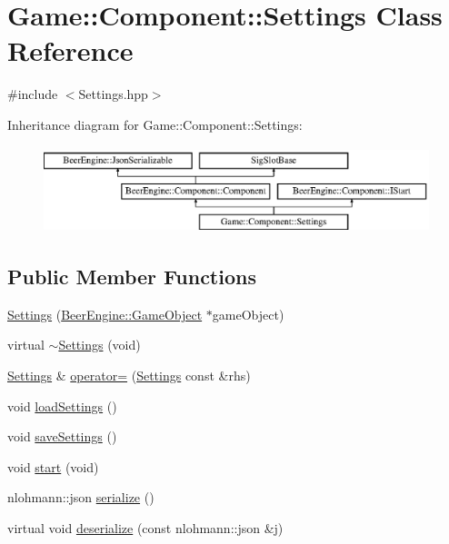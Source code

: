 \hypertarget{class_game_1_1_component_1_1_settings}{}\section{Game\+:\+:Component\+:\+:Settings Class Reference}
\label{class_game_1_1_component_1_1_settings}


{\ttfamily \#include $<$Settings.\+hpp$>$}

Inheritance diagram for Game\+:\+:Component\+:\+:Settings\+:\begin{figure}[H]
\begin{center}
\leavevmode
\includegraphics[height=2.500000cm]{class_game_1_1_component_1_1_settings}
\end{center}
\end{figure}
\subsection*{Public Member Functions}
\begin{DoxyCompactItemize}
\item 
\mbox{\hyperlink{class_game_1_1_component_1_1_settings_a2a0d16fdd698140da965cd3367601a49}{Settings}} (\mbox{\hyperlink{class_beer_engine_1_1_game_object}{Beer\+Engine\+::\+Game\+Object}} $\ast$game\+Object)
\item 
virtual \mbox{\hyperlink{class_game_1_1_component_1_1_settings_ad6ce9d5380a251f7a46c4360419211eb}{$\sim$\+Settings}} (void)
\item 
\mbox{\hyperlink{class_game_1_1_component_1_1_settings}{Settings}} \& \mbox{\hyperlink{class_game_1_1_component_1_1_settings_a8744e8a07e0c730945508836912a7609}{operator=}} (\mbox{\hyperlink{class_game_1_1_component_1_1_settings}{Settings}} const \&rhs)
\item 
void \mbox{\hyperlink{class_game_1_1_component_1_1_settings_a8edddda1b5367a5343f2182750f0f36b}{load\+Settings}} ()
\item 
void \mbox{\hyperlink{class_game_1_1_component_1_1_settings_ad8883dfb4a2ae8a041e293e73c7a6dc5}{save\+Settings}} ()
\item 
void \mbox{\hyperlink{class_game_1_1_component_1_1_settings_adc79077ed00bee2d8ed987ea4b86a331}{start}} (void)
\item 
nlohmann\+::json \mbox{\hyperlink{class_game_1_1_component_1_1_settings_a1e378dbe2c0c7a198eae234e5979e91f}{serialize}} ()
\item 
virtual void \mbox{\hyperlink{class_game_1_1_component_1_1_settings_ae9edc71830f43d318f8dbcedce2d8bf9}{deserialize}} (const nlohmann\+::json \&j)
\end{DoxyCompactItemize}
